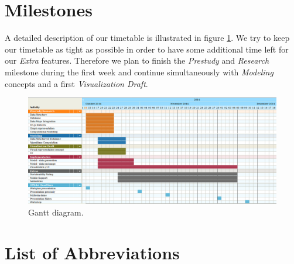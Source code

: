 \documentclass[a4page]{article}
\begin{document}
\section{Milestones}

A detailed description of our timetable is illustrated in figure \ref{fig:gant-diagram}. We try to keep our timetable as tight as possible in order to have some additional time left for our \textit{Extra} features. Therefore we plan to finish the \textit{Prestudy} and \textit{Research} milestone during the first week and continue simultaneously with \textit{Modeling} concepts and a first \textit{Visualization Draft}. 

\begin{figure}[ht]
 \centering
 \includegraphics[scale=0.5]{gantt.png}
 \caption{Gantt diagram.}
 \label{fig:gant-diagram}
\end{figure}

\newpage
\section*{List of Abbreviations}
\begin{acronym}
\end{acronym}



\end{document}
